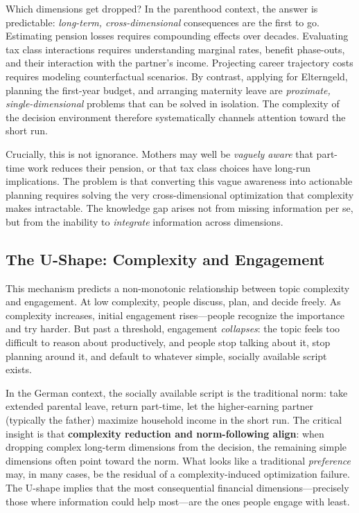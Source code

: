 \documentclass[12pt,a4paper]{article}
\begin{document}
Which dimensions get dropped? In the parenthood context, the answer is predictable: \emph{long-term, cross-dimensional} consequences are the first to go. Estimating pension losses requires compounding effects over decades. Evaluating tax class interactions requires understanding marginal rates, benefit phase-outs, and their interaction with the partner's income. Projecting career trajectory costs requires modeling counterfactual scenarios. By contrast, applying for Elterngeld, planning the first-year budget, and arranging maternity leave are \emph{proximate, single-dimensional} problems that can be solved in isolation. The complexity of the decision environment therefore systematically channels attention toward the short run.

Crucially, this is not ignorance. Mothers may well be \emph{vaguely aware} that part-time work reduces their pension, or that tax class choices have long-run implications. The problem is that converting this vague awareness into actionable planning requires solving the very cross-dimensional optimization that complexity makes intractable. The knowledge gap arises not from missing information per se, but from the inability to \emph{integrate} information across dimensions.

\subsection{The U-Shape: Complexity and Engagement}

This mechanism predicts a non-monotonic relationship between topic complexity and engagement. At low complexity, people discuss, plan, and decide freely. As complexity increases, initial engagement rises---people recognize the importance and try harder. But past a threshold, engagement \emph{collapses}: the topic feels too difficult to reason about productively, and people stop talking about it, stop planning around it, and default to whatever simple, socially available script exists.

In the German context, the socially available script is the traditional norm: take extended parental leave, return part-time, let the higher-earning partner (typically the father) maximize household income in the short run. The critical insight is that \textbf{complexity reduction and norm-following align}: when dropping complex long-term dimensions from the decision, the remaining simple dimensions often point toward the norm. What looks like a traditional \emph{preference} may, in many cases, be the residual of a complexity-induced optimization failure. The U-shape implies that the most consequential financial dimensions---precisely those where information could help most---are the ones people engage with least.
\end{document}
